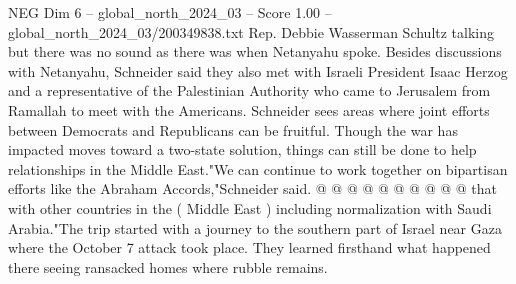 \begin{textsample}{NEG Dim 6 – global\_north\_2024\_03 – Score 1.00 – global\_north\_2024\_03/200349838.txt}
Rep.
Debbie Wasserman Schultz talking but there was no sound as there was when Netanyahu spoke.
Besides discussions with Netanyahu, Schneider said they also met with Israeli President Isaac Herzog and a representative of the Palestinian Authority who came to Jerusalem from Ramallah to meet with the Americans.
Schneider sees areas where joint efforts between Democrats and Republicans can be fruitful.
Though the war has impacted moves toward a two-state solution, things can still be done to help relationships in the Middle East."We can continue to work together on bipartisan efforts like the Abraham Accords,"Schneider said. @ @ @ @ @ @ @ @ @ @ that with other countries in the ( Middle East ) including normalization with Saudi Arabia."The trip started with a journey to the southern part of Israel near Gaza where the October 7 attack took place.
They learned firsthand what happened there seeing ransacked homes where rubble remains.

\end{textsample}
